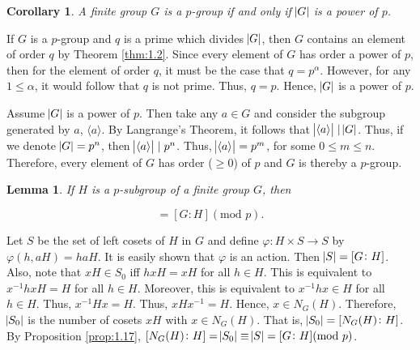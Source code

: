 \documentclass{article}
\makeatletter
\newtheorem{corollary}{Corollary}[theorem]
\newtheorem{lemma}{Lemma}[theorem]
\theoremstyle{definition}
\theoremstyle{remark}
\let\oldproofname=\proofname
\renewcommand{\proofname}{\bf{\textit{\oldproofname}}}
\theoremstyle{definition}
\renewenvironment{proof}[1][\proofname]{\par
  \pushQED{\qed}%
  \normalfont \topsep6\p@\@plus6\p@\relax
  \list{}{\leftmargin=0mm
          \rightmargin=0mm
          \settowidth{\itemindent}{\itshape#1}%
          \labelwidth=4mm
          \parsep=0pt \listparindent=0mm%
  }
  \item[\hskip\labelsep
        \itshape
    #1\@addpunct{.}]\ignorespaces
}{%
  \popQED\endlist\@endpefalse
}
\makeatother
\begin{document}
    \begin{corollary}\label{cor:1.2.1}
        A finite group $G$ is a $p$-group if and only if $\abs{G}$ is a power of $p$.
    \end{corollary}
        \begin{proof}
            If $G$ is a $p$-group and $q$ is a prime which divides $\abs{G}$, then $G$ contains an element of order $q$ by Theorem \ref{thm:1.2}. Since every element of $G$ has order a power of $p$, then for the element of order $q$, it must be the case that $q=p^{\alpha}$. However, for any $1\leq\alpha$, it would follow that $q$ is not prime. Thus, $q=p$. Hence, $\abs{G}$ is a power of $p$.\par\hspace{4mm} Assume $\abs{G}$ is a power of $p$. Then take any $a\in G$ and consider the subgroup generated by $a$, $\langle a\rangle$. By Langrange's Theorem, it follows that $\abs{\langle a\rangle}\mid\abs{G}$. Thus, if we denote $\abs{G}=p^n$, then $\abs{\langle a\rangle}\mid p^n$. Thus, $\abs{\langle a\rangle}=p^m$, for some $0\leq m\leq n$. Therefore, every element of $G$ has order ($\geq 0$) of $p$ and $G$ is thereby a $p$-group.
        \end{proof}
        
    \begin{lemma}\label{lem:1.2.1}
        If $H$ is a $p$-subgroup of a finite group $G$, then
        
        \begin{equation*}
            [N_G(H)\colon H]=[G\colon H](\text{mod }p).
        \end{equation*}
    \end{lemma}
        \begin{proof}
            Let $S$ be the set of left cosets of $H$ in $G$ and define $\varphi\colon H\times S\rightarrow S$ by $\varphi(h,aH)=haH$. It is easily shown that $\varphi$ is an action. Then $\abs{S}=[G\colon H]$. Also, note that $xH\in S_0$ iff $hxH=xH$ for all $h\in H$. This is equivalent to $x^{-1}hxH=H$ for all $h\in H$. Moreover, this is equivalent to $x^{-1}hx\in H$ for all $h\in H$. Thus, $x^{-1}Hx=H$. Thus, $xHx^{-1}=H$. Hence, $x\in N_G(H)$. Therefore, $\abs{S_0}$ is the number of cosets $xH$ with $x\in N_G(H)$. That is, $\abs{S_0}=[N_G(H)\colon H]$. By Proposition \ref{prop:1.17}, $[N_G(H)\colon H]=\abs{S_0}\equiv\abs{S}=[G\colon H](\text{mod }p)$.
        \end{proof}
        
\end{document}
